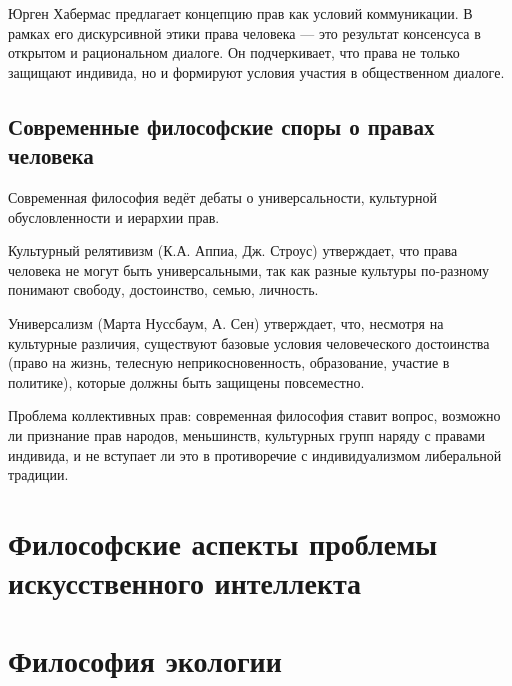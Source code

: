 \documentclass[12pt,a4paper]{article}
\begin{document}
	Юрген Хабермас предлагает концепцию прав как условий коммуникации. В рамках его дискурсивной этики права человека — это результат консенсуса в открытом и рациональном диалоге. Он подчеркивает, что права не только защищают индивида, но и формируют условия участия в общественном диалоге.
	
	\subsection{Современные философские споры о правах человека}
	Современная философия ведёт дебаты о универсальности, культурной обусловленности и иерархии прав.
	
	Культурный релятивизм (К.А. Аппиа, Дж. Строус) утверждает, что права человека не могут быть универсальными, так как разные культуры по-разному понимают свободу, достоинство, семью, личность.
	
	Универсализм (Марта Нуссбаум, А. Сен) утверждает, что, несмотря на культурные различия, существуют базовые условия человеческого достоинства (право на жизнь, телесную неприкосновенность, образование, участие в политике), которые должны быть защищены повсеместно.
	
	Проблема коллективных прав: современная философия ставит вопрос, возможно ли признание прав народов, меньшинств, культурных групп наряду с правами индивида, и не вступает ли это в противоречие с индивидуализмом либеральной традиции.
	
	\section{Философские аспекты проблемы искусственного интеллекта}
	
	\section{Философия экологии~\checkmark}
\end{document}

